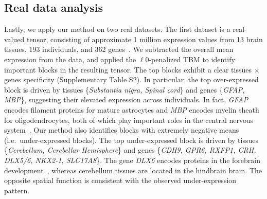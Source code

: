 \documentclass{article}
\begin{document}
\begin{table}[H]
\centering
\caption{\small Sparse TBM for estimating tensors of dimension $\md=(40,40,40)$. The reported statistics are averaged across 50 simulations with standard deviation given in parentheses. Number in bold indicates the ground truth is within 2 standard deviations of the sample average.}\label{t5}
\end{table}

\vspace{-1cm}
\subsection{Real data analysis}

Lastly, we apply our method on two real datasets. %
The first dataset is a real-valued tensor, consisting of approximate 1 million expression values from 13 brain tissues, 193 individuals, and 362 genes~\cite{wang2017three}. We subtracted the overall mean expression from the data, and applied the $\ell0$-penalized TBM to identify important blocks in the resulting tensor. The top blocks exhibit a clear tissues $\times$ genes specificity (Supplementary Table S2). In particular, the top over-expressed block is driven by tissues \{\emph{Substantia nigra, Spinal cord}\} and genes \{\emph{GFAP, MBP}\}, suggesting their elevated expression across individuals. In fact, \emph{GFAP} encodes filament proteins for mature astrocytes and \emph{MBP} encodes myelin sheath for oligodendrocytes, both of which play important roles in the central nervous system~\cite{o2015reference}. Our method also identifies blocks with extremely negative means (i.e.\ under-expressed blocks). The top under-expressed block is driven by tissues \{\emph{Cerebellum, Cerebellar Hemisphere}\} and genes \{\emph{CDH9, GPR6, RXFP1, CRH, DLX5/6, NKX2-1, SLC17A8}\}. The gene \emph{DLX6} encodes proteins in the forebrain development~\cite{o2015reference}, whereas cerebellum tissues are located in the hindbrain brain. The opposite spatial function is consistent with the observed under-expression pattern. 
\end{document}
